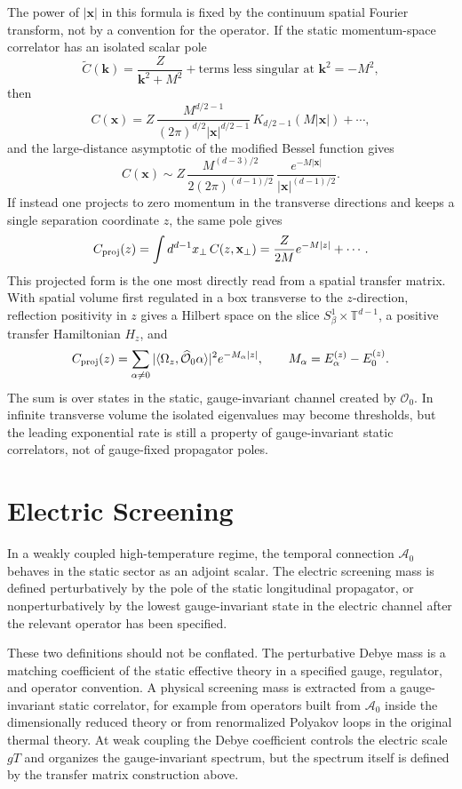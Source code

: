 The power of \(|\mathbf x|\) in this formula is fixed by the continuum
spatial Fourier transform, not by a convention for the operator.  If the
static momentum-space correlator has an isolated scalar pole
\[
  \widetilde C(\mathbf k)
  =
  \frac{Z}{\mathbf k^2+M^2}
  +\text{terms less singular at }\mathbf k^2=-M^2 ,
\]
then
\begin{equation}
  C(\mathbf x)
  =
  Z\,\frac{M^{d/2-1}}{(2\pi)^{d/2}|\mathbf x|^{d/2-1}}\,
  K_{d/2-1}(M|\mathbf x|)
  +\cdots ,
  \label{eq:thermal-screening-yukawa-bessel}
\end{equation}
and the large-distance asymptotic of the modified Bessel function gives
\[
  C(\mathbf x)
  \sim
  Z\,\frac{M^{(d-3)/2}}{2(2\pi)^{(d-1)/2}}\,
  \frac{e^{-M|\mathbf x|}}{|\mathbf x|^{(d-1)/2}} .
\]
If instead one projects to zero momentum in the transverse directions and
keeps a single separation coordinate \(z\), the same pole gives
\[
  C_{\rm proj}(z)
  =
  \int d^{d-1}x_\perp\,C(z,\mathbf x_\perp)
  =
  \frac{Z}{2M}e^{-M|z|}
  +\cdots .
\]
This projected form is the one most directly read from a spatial transfer
matrix.  With spatial volume first regulated in a box transverse to the
\(z\)-direction, reflection positivity in \(z\) gives a Hilbert space on the
slice \(S^1_\beta\times\mathbb T^{d-1}\), a positive transfer Hamiltonian
\(H_z\), and
\[
  C_{\rm proj}(z)
  =
  \sum_{\alpha\ne0}
  |\langle\Omega_z,\widehat{\mathcal O}_0\alpha\rangle|^2
  e^{-M_\alpha |z|},
  \qquad
  M_\alpha=E_\alpha^{(z)}-E_0^{(z)} .
\]
The sum is over states in the static, gauge-invariant channel created by
\(\mathcal O_0\).  In infinite transverse volume the isolated eigenvalues may
become thresholds, but the leading exponential rate is still a property of
gauge-invariant static correlators, not of gauge-fixed propagator poles.

\section{Electric Screening}

In a weakly coupled high-temperature regime, the temporal connection
\(\mathcal A_0\) behaves in the static sector as an adjoint scalar.  The
electric screening mass is defined perturbatively by the pole of the static
longitudinal propagator, or nonperturbatively by the lowest gauge-invariant
state in the electric channel after the relevant operator has been specified.

These two definitions should not be conflated.  The perturbative Debye mass
is a matching coefficient of the static effective theory in a specified
gauge, regulator, and operator convention.  A physical screening mass is
extracted from a gauge-invariant static correlator, for example from
operators built from \(\mathcal A_0\) inside the dimensionally reduced theory
or from renormalized Polyakov loops in the original thermal theory.  At weak
coupling the Debye coefficient controls the electric scale \(gT\) and
organizes the gauge-invariant spectrum, but the spectrum itself is defined by
the transfer matrix construction above.

